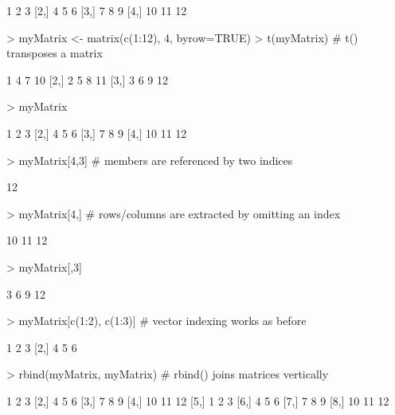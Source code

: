 \documentclass[10pt,letterpaper]{article}
\begin{document}
\begin{Schunk}
\begin{Soutput}
     [,1] [,2] [,3]
[1,]    1    2    3
[2,]    4    5    6
[3,]    7    8    9
[4,]   10   11   12
\end{Soutput}
\begin{Sinput}
> myMatrix <- matrix(c(1:12), 4, byrow=TRUE)
> t(myMatrix)                             # t() transposes a matrix
\end{Sinput}
\begin{Soutput}
     [,1] [,2] [,3] [,4]
[1,]    1    4    7   10
[2,]    2    5    8   11
[3,]    3    6    9   12
\end{Soutput}
\begin{Sinput}
> myMatrix
\end{Sinput}
\begin{Soutput}
     [,1] [,2] [,3]
[1,]    1    2    3
[2,]    4    5    6
[3,]    7    8    9
[4,]   10   11   12
\end{Soutput}
\begin{Sinput}
> myMatrix[4,3]                   # members are referenced by two indices
\end{Sinput}
\begin{Soutput}
[1] 12
\end{Soutput}
\begin{Sinput}
> myMatrix[4,]             # rows/columns are extracted by omitting an index
\end{Sinput}
\begin{Soutput}
[1] 10 11 12
\end{Soutput}
\begin{Sinput}
> myMatrix[,3]
\end{Sinput}
\begin{Soutput}
[1]  3  6  9 12
\end{Soutput}
\begin{Sinput}
> myMatrix[c(1:2), c(1:3)] # vector indexing works as before
\end{Sinput}
\begin{Soutput}
     [,1] [,2] [,3]
[1,]    1    2    3
[2,]    4    5    6
\end{Soutput}
\begin{Sinput}
> rbind(myMatrix, myMatrix)       # rbind() joins matrices vertically
\end{Sinput}
\begin{Soutput}
     [,1] [,2] [,3]
[1,]    1    2    3
[2,]    4    5    6
[3,]    7    8    9
[4,]   10   11   12
[5,]    1    2    3
[6,]    4    5    6
[7,]    7    8    9
[8,]   10   11   12
\end{Soutput}

\end{Schunk}
\end{document}
